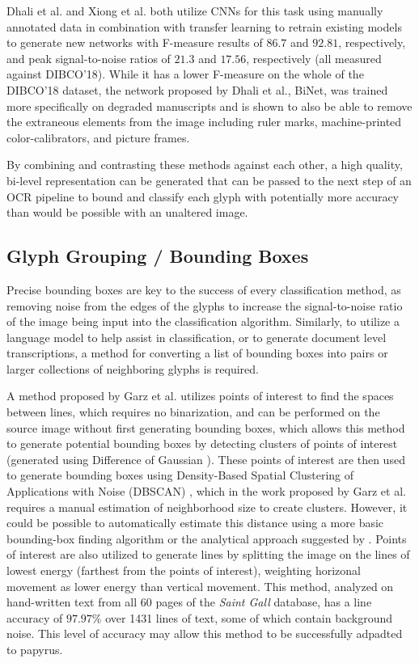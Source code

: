 Dhali et al.\cite{Dhali2019} and Xiong et al.\cite{Xiong} both utilize CNNs for this task using manually annotated data in combination with transfer learning to retrain existing models to generate new networks with F-measure results of $86.7$ and $92.81$, respectively, and peak signal-to-noise ratios of $21.3$ and $17.56$, respectively (all measured against DIBCO'18). While it has a lower F-measure on the whole of the DIBCO'18 dataset, the network proposed by Dhali et al., BiNet, was trained more specifically on degraded manuscripts and is shown to also be able to remove the extraneous elements from the image including ruler marks, machine-printed color-calibrators, and picture frames.

By combining and contrasting these methods against each other, a high quality, bi-level representation can be generated that can be passed to the next step of an OCR pipeline to bound and classify each glyph with potentially more accuracy than would be possible with an unaltered image.

\subsection{Glyph Grouping / Bounding Boxes}
Precise bounding boxes are key to the success of every classification method, as removing noise from the edges of the glyphs to increase the signal-to-noise ratio of the image being input into the classification algorithm. Similarly, to utilize a language model to help assist in classification, or to generate document level transcriptions, a method for converting a list of bounding boxes into pairs or larger collections of neighboring glyphs is required.

A method proposed by Garz et al.\cite{Garz2012, Garz2011} utilizes points of interest to find the spaces between lines, which requires no binarization, and can be performed on the source image without first generating bounding boxes, which allows this method to generate potential bounding boxes by detecting clusters of points of interest (generated using Difference of Gaussian \cite{Lowe}). These points of interest are then used to generate bounding boxes using Density-Based Spatial Clustering of Applications with Noise (DBSCAN) \cite{Ester}, which in the work proposed by Garz et al.\cite{Garz2012, Garz2011} requires a manual estimation of neighborhood size to create clusters. However, it could be possible to automatically estimate this distance using a more basic bounding-box finding algorithm or the analytical approach suggested by \cite{Daszykowski}. Points of interest are also utilized to generate lines by splitting the image on the lines of lowest energy (farthest from the points of interest), weighting horizonal movement as lower energy than vertical movement.
This method, analyzed on hand-written text from all 60 pages of the \textit{Saint Gall} database, has a line accuracy of $97.97\%$ over 1431 lines of text, some of which contain background noise. This level of accuracy may allow this method to be successfully adpadted to papyrus.

